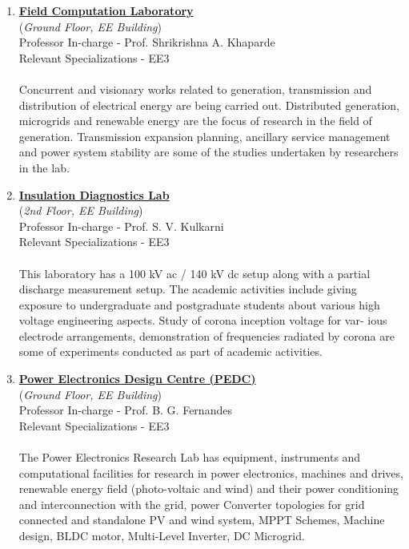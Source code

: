 \documentclass[openany]{book} %
\begin{document}
\begin{enumerate}
\item \href{https://www.ee.iitb.ac.in/web/research/labs/fcl} {\color{blue} \textbf{Field Computation Laboratory}}\\
    (\textit{Ground Floor, EE Building})\\
    Professor In-charge - Prof. Shrikrishna A. Khaparde\\
Relevant Specializations - EE3\\
\\
Concurrent and visionary works related to generation, transmission and distribution of electrical energy are being carried out. Distributed generation, microgrids and renewable energy are the focus of research in the field of generation. Transmission expansion planning, ancillary service
management and power system stability are some of the studies undertaken by researchers in the lab.\\


\item \href{https://www.ee.iitb.ac.in/~idlab/Home\%20Page.html} {\color{blue} \textbf{Insulation Diagnostics Lab}}\\
    (\textit{2nd Floor, EE Building})\\
    Professor In-charge - Prof. S. V. Kulkarni\\
Relevant Specializations - EE3\\
\\
This laboratory has a 100 kV ac / 140 kV dc setup along with a partial discharge measurement setup. The academic activities include giving exposure to undergraduate and postgraduate students about various high voltage engineering aspects. Study of corona inception voltage for var-
ious electrode arrangements, demonstration of frequencies radiated by corona are some of experiments conducted as part of academic activities.\\


\item \href{https://www.ee.iitb.ac.in/web/research/labs/pedc} {\color{blue} \textbf{Power Electronics Design Centre (PEDC)}}\\
    (\textit{Ground Floor, EE Building})\\
    Professor In-charge - Prof. B. G. Fernandes\\
Relevant Specializations - EE3\\
\\
The Power Electronics Research Lab has equipment, instruments and computational facilities for research in power electronics, machines and drives, renewable energy field (photo-voltaic and wind) and their power conditioning and interconnection with the grid, power Converter topologies for grid connected and standalone PV and wind system, MPPT Schemes, Machine design, BLDC motor, Multi-Level Inverter, DC Microgrid.\\



\end{enumerate}
\end{document}
